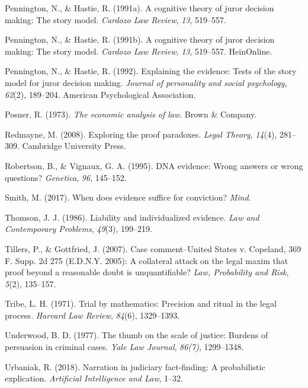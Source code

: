 \documentclass[11pt,dvipsnames,enabledeprecatedfontcommands]{scrartcl}
\begin{document}
\hypertarget{ref-Pennington1991}{}
Pennington, N., \& Hastie, R. (1991a). A cognitive theory of juror
decision making: The story model. \emph{Cardozo Law Review}, \emph{13},
519--557.

\hypertarget{ref-pennington1991cognitive}{}
Pennington, N., \& Hastie, R. (1991b). A cognitive theory of juror
decision making: The story model. \emph{Cardozo Law Review}, \emph{13},
519--557. HeinOnline.

\hypertarget{ref-pennington1992explaining}{}
Pennington, N., \& Hastie, R. (1992). Explaining the evidence: Tests of
the story model for juror decision making. \emph{Journal of personality
and social psychology}, \emph{62}(2), 189--204. American Psychological
Association.

\hypertarget{ref-Posner1973}{}
Posner, R. (1973). \emph{The economic analysis of law}. Brown \&
Company.

\hypertarget{ref-redmayne2008exploring}{}
Redmayne, M. (2008). Exploring the proof paradoxes. \emph{Legal Theory},
\emph{14}(4), 281--309. Cambridge University Press.

\hypertarget{ref-Robertson1995evidence}{}
Robertson, B., \& Vignaux, G. A. (1995). DNA evidence: Wrong answers or
wrong questions? \emph{Genetica}, \emph{96}, 145--152.

\hypertarget{ref-Smith_conviction_mind_2017}{}
Smith, M. (2017). When does evidence suffice for conviction?
\emph{Mind}.

\hypertarget{ref-Thomson86}{}
Thomson, J. J. (1986). Liability and individualized evidence. \emph{Law
and Contemporary Problems}, \emph{49}(3), 199--219.

\hypertarget{ref-Tillers2007}{}
Tillers, P., \& Gottfried, J. (2007). Case comment--United States v.
Copeland, 369 F. Supp. 2d 275 (E.D.N.Y. 2005): A collateral attack on
the legal maxim that proof beyond a reasonable doubt is unquantifiable?
\emph{Law, Probability and Risk}, \emph{5}(2), 135--157.

\hypertarget{ref-tribe71}{}
Tribe, L. H. (1971). Trial by mathematics: Precision and ritual in the
legal process. \emph{Harvard Law Review}, \emph{84}(6), 1329--1393.

\hypertarget{ref-Underwood1977The-thumb-on-th}{}
Underwood, B. D. (1977). The thumb on the scale of justice: Burdens of
persuasion in criminal cases. \emph{Yale Law Journal}, \emph{86(7)},
1299--1348.

\hypertarget{ref-urbaniak2018narration}{}
Urbaniak, R. (2018). Narration in judiciary fact-finding: A
probabilistic explication. \emph{Artificial Intelligence and Law},
1--32.
\end{document}

